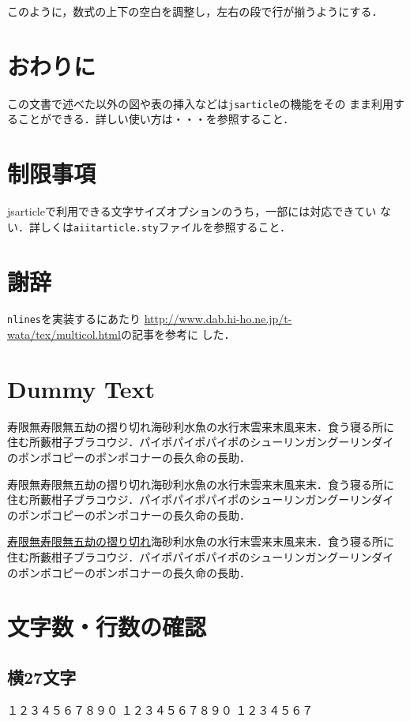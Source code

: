 \documentclass[a4j, 12Q, twocolumn, twoside, draft]{jsarticle}
\newcommand{\cmd}[1]{\texttt{\symbol{"5C}#1}} %
\begin{document}

このように，数式の上下の空白を調整し，左右の段で行が揃うようにする．


 \section{おわりに}
この文書で述べた以外の図や表の挿入などは\texttt{jsarticle}の機能をその
まま利用することができる．詳しい使い方は・・・を参照すること．
\section{制限事項}
jsarticleで利用できる文字サイズオプションのうち，一部には対応できてい
ない．詳しくは\texttt{aiitarticle.sty}ファイルを参照すること．

\section{謝辞}
\cmd{nlines}を実装するにあたり
\url{http://www.dab.hi-ho.ne.jp/t-wata/tex/multicol.html}の記事を参考に
した．

\section{Dummy Text}
寿限無寿限無五劫の摺り切れ海砂利水魚の水行末雲来末風来末．食う寝る所に
住む所藪柑子ブラコウジ．パイポパイポパイポのシューリンガングーリンダイ
のポンポコピーのポンポコナーの長久命の長助．

寿限無寿限無五劫の摺り切れ海砂利水魚の水行末雲来末風来末．食う寝る所に
住む所藪柑子ブラコウジ．パイポパイポパイポのシューリンガングーリンダイ
のポンポコピーのポンポコナーの長久命の長助．

\underline{寿限無寿限無五劫の摺り切れ}海砂利水魚の水行末雲来末風来末．食う寝る所に
住む所藪柑子ブラコウジ．パイポパイポパイポのシューリンガングーリンダイ
のポンポコピーのポンポコナーの長久命の長助．


\clearpage
\appendix
\section{文字数・行数の確認}
\subsection{横27文字}
\noindent
１２３４５６７８９０
１２３４５６７８９０
１２３４５６７%
\end{document}
